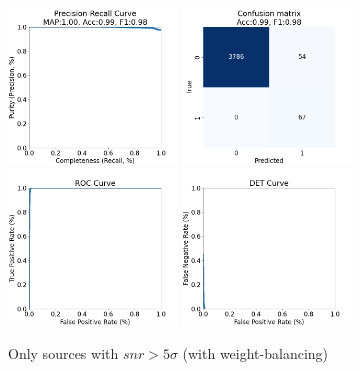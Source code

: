 \documentclass[DM,authoryear,toc]{lsstdoc}
\begin{document}
\begin{figure}[h]
  \centering
  \includegraphics[width=0.4\textwidth]{precrec_13-resnet50-FullAugmentation-scratch-B64__0255000__npy_data_0.1.2-5sigma_256by256__posw_20.png}
  \includegraphics[width=0.4\textwidth]{confmat_13-resnet50-FullAugmentation-scratch-B64__0255000__npy_data_0.1.2-5sigma_256by256__posw_20.png}
  \includegraphics[width=0.4\textwidth]{roc_13-resnet50-FullAugmentation-scratch-B64__0255000__npy_data_0.1.2-5sigma_256by256__posw_20.png}
  \includegraphics[width=0.4\textwidth]{det_13-resnet50-FullAugmentation-scratch-B64__0255000__npy_data_0.1.2-5sigma_256by256__posw_20.png}
  \caption{Only sources with $snr > 5\sigma$ (with weight-balancing)}
  \label{fig:tract_templates}
\end{figure}
\end{document}
